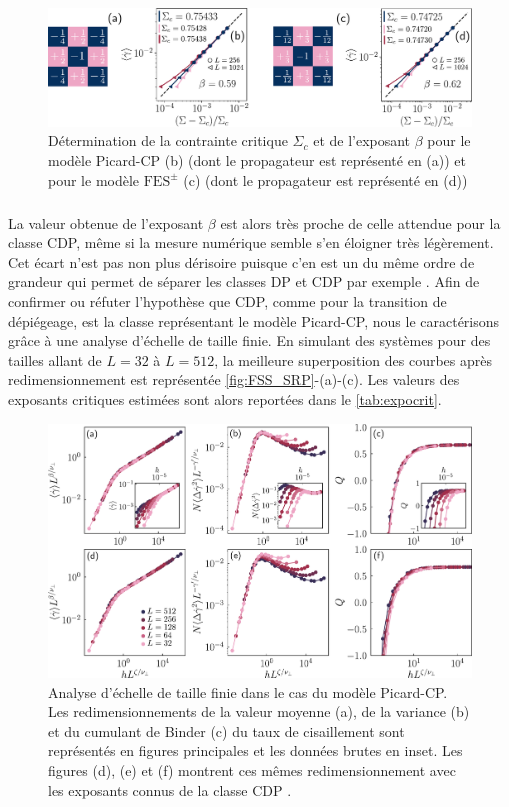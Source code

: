 \begin{figure}[h]
	\centering
	\includegraphics[width=\textwidth]{Chapitre4/Figures/CourtePortee/Prog_CP.pdf}
	\caption{Détermination de la contrainte critique $\Sigma_c$ et de l'exposant $\beta$ pour le modèle Picard-CP (b) (dont le propagateur est représenté en (a)) et pour le modèle $\text{FES}^\pm$ (c) (dont le propagateur est représenté en (d))}
	\label{fig:Prog_CP_SR}
\end{figure}

\subparagraph{}La valeur obtenue de l'exposant $\beta$ est alors très proche de celle attendue pour la classe CDP, même si la mesure numérique semble s'en éloigner très légèrement. Cet écart n'est pas non plus dérisoire puisque c'en est un du même ordre de grandeur qui permet de séparer les classes DP et CDP par exemple \cite{lubeck_universal_2004}. Afin de confirmer ou réfuter l'hypothèse que CDP, comme pour la transition de dépiégeage, est la classe représentant le modèle Picard-CP, nous le caractérisons grâce à une analyse d'échelle de taille finie. En simulant des systèmes pour des tailles allant de $L=32$ à $L=512$, la meilleure superposition des courbes après redimensionnement est représentée \autoref{fig:FSS_SRP}-(a)-(c). Les valeurs des exposants critiques estimées sont alors reportées dans le \autoref{tab:expocrit}.

\begin{figure}[h]
	\centering
	\includegraphics[width=\textwidth]{Chapitre4/Figures/CourtePortee/FSS_SRP_edited.pdf}
	\caption{Analyse d'échelle de taille finie dans le cas du modèle Picard-CP. Les redimensionnements de la valeur moyenne (a), de la variance (b) et du cumulant de Binder (c) du taux de cisaillement sont représentés en figures principales et les données brutes en inset. Les figures (d), (e) et (f) montrent ces mêmes redimensionnement avec les exposants connus de la classe CDP \cite{lubeck_universal_2004}.}
	\label{fig:FSS_SRP}
\end{figure}

